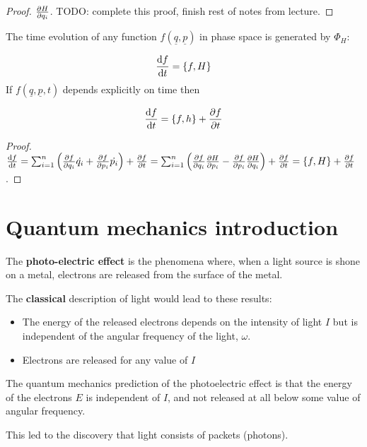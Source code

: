 \begin{proof}
	$\diffp{H}{q_i}$. TODO: complete this proof, finish rest of notes from lecture.
\end{proof}

\begin{corollary}
	The time evolution of any function $f(\underline{q}, \underline{p})$ in phase space is generated by $\Phi_H$:

	\[ \diff{f}{t} = \{ f, H \} \]
	If $f(\underline{q}, \underline{p}, t)$ depends explicitly on time then

	\[ \diff{f}{t} = \{ f, h \} + \diffp{f}{t} \]
\end{corollary}

\begin{proof}
	$\diff{f}{t} = \sum_{i = 1}^n \left( \diffp{f}{q_i} \dot{q_i} + \diffp{f}{p_i} \dot{p_i} \right) + \diffp{f}{t} = \sum_{i = 1}^n \left( \diffp{f}{q_i} \diffp{H}{p_i} - \diffp{f}{p_i} \diffp{H}{q_i} \right) + \diffp{f}{t} = \{ f, H \} + \diffp{f}{t}$.
\end{proof}

\section{Quantum mechanics introduction}

\begin{definition}
	The \textbf{photo-electric effect} is the phenomena where, when a light source is shone on a metal, electrons are released from the surface of the metal.
\end{definition}

\begin{definition}
	The \textbf{classical} description of light would lead to these results:
	\begin{itemize}
		\item The energy of the released electrons depends on the intensity of light $I$ but is independent of the angular frequency of the light, $\omega$.
		\item Electrons are released for any value of $I$
	\end{itemize}
\end{definition}

\begin{definition}
	The quantum mechanics prediction of the photoelectric effect is that the energy of the electrons $E$ is independent of $I$, and not released at all below some value of angular frequency.

	This led to the discovery that light consists of packets (photons).
\end{definition}

